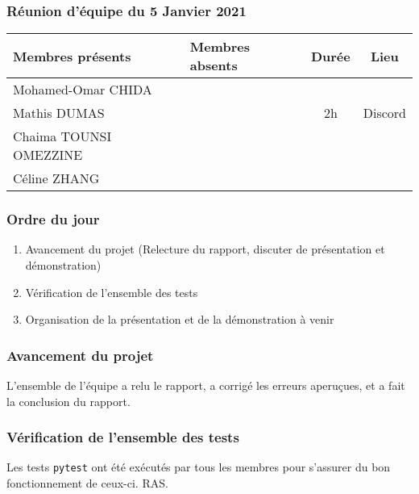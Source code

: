 


% 
\subsubsection*{\large{Réunion d'équipe du 5 Janvier 2021}}
\begin{center}
\begin{tabular}{| l | l || c | c |}
    \hline
    Membres présents & Membres absents & Durée & Lieu \\
    \hline
    Mohamed-Omar CHIDA & & & \\ Mathis DUMAS & & 2h & Discord \\ Chaima TOUNSI OMEZZINE & & & \\ Céline ZHANG & & & \\
    \hline
\end{tabular}
\end{center}

\subsubsection*{Ordre du jour}
\begin{enumerate}
    \item Avancement du projet (Relecture du rapport, discuter de présentation et démonstration)
    \item Vérification de l'ensemble des tests
    \item Organisation de la présentation et de la démonstration à venir
\end{enumerate}

\subsubsection*{Avancement du projet}
L'ensemble de l'équipe a relu le rapport, a corrigé les erreurs aperuçues, et a fait la conclusion du rapport.

\subsubsection*{Vérification de l'ensemble des tests}
Les tests \texttt{pytest} ont été exécutés par tous les membres pour s'assurer du bon fonctionnement de ceux-ci. RAS.

